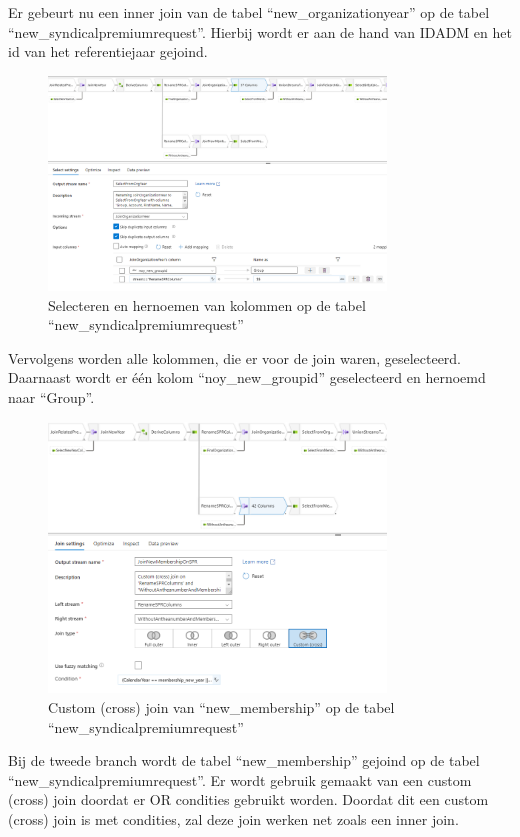 Er gebeurt nu een inner join van de tabel ``new\_organizationyear'' op de tabel ``new\_syndicalpremiumrequest''. Hierbij wordt er aan de hand van IDADM en het id van het referentiejaar gejoind.

\begin{figure}[H]
    \centering
    \includegraphics[width=0.8\textwidth]{./graphics/adf/bepalen_groep_5.png}
    \caption{Selecteren en hernoemen van kolommen op de tabel ``new\_syndicalpremiumrequest''}
\end{figure}

Vervolgens worden alle kolommen, die er voor de join waren, geselecteerd. Daarnaast wordt er één kolom ``noy\_new\_groupid'' geselecteerd en hernoemd naar ``Group''.

\begin{figure}[H]
    \centering
    \includegraphics[width=0.8\textwidth]{./graphics/adf/bepalen_groep_6.png}
    \caption{Custom (cross) join van ``new\_membership'' op de tabel ``new\_syndicalpremiumrequest''}
\end{figure}

Bij de tweede branch wordt de tabel ``new\_membership'' gejoind op de tabel ``new\_syndicalpremiumrequest''. Er wordt gebruik gemaakt van een custom (cross) join doordat er OR condities gebruikt worden. Doordat dit een custom (cross) join is met condities, zal deze join werken net zoals een inner join. 

